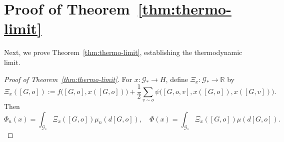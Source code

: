 \documentclass[11pt]{article}
\newcommand{\R}{{\mathbb R}}
\newcommand{\be}{\begin{equation}}
\newcommand{\ee}{\end{equation}}
\numberwithin{equation}{section}
\begin{document}
\section{Proof of Theorem~\ref{thm:thermo-limit}}\label{sec:proof-conv}

Next, we prove Theorem~\ref{thm:thermo-limit}, establishing the thermodynamic limit.

\begin{proof}[Proof of Theorem~\ref{thm:thermo-limit}]
For \(x:\mathcal G_\ast\to H\), define $\Xi_x:\mathcal G_\ast\to\R$ by
\begin{equation}\label{eq:Xi-thermo}
\Xi_x([G,o])
:=
f\big([G,o],x([G,o])\big)
+
\frac12\sum_{v\sim o}\psi\big([G,o,v],x([G,o]),x([G,v])\big).
\end{equation}
Then
\be\label{eq:potential-xi}
\Phi_n(x)=\int_{\mathcal G_\ast}\Xi_x([G,o])\mu_n(d[G,o]),
\quad
\Phi(x)=\int_{\mathcal G_\ast}\Xi_x([G,o])\mu(d[G,o]).
\ee


\end{proof}
\end{document}
